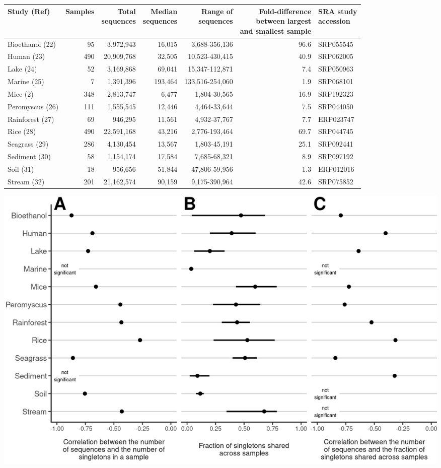 \documentclass[
]{article}
\begin{document}
\begin{longtable}[]{@{}lrrrrrl@{}}
\toprule
\textbf{Study (Ref)} & \textbf{Samples} &
\makecell[c]{\textbf{Total}\\\textbf{sequences}} &
\makecell[c]{\textbf{Median}\\\textbf{sequences}} &
\makecell[c]{\textbf{Range of}\\\textbf{sequences}} &
\makecell[c]{\textbf{Fold-difference}\\\textbf{between largest}\\\textbf{and smallest sample}}
& \makecell[c]{\textbf{SRA study}\\\textbf{accession}}\tabularnewline
\midrule
\endhead
Bioethanol (22) & 95 & 3,972,943 & 16,015 & 3,688-356,136 & 96.6 &
SRP055545\tabularnewline
Human (23) & 490 & 20,909,768 & 32,505 & 10,523-430,415 & 40.9 &
SRP062005\tabularnewline
Lake (24) & 52 & 3,169,868 & 69,041 & 15,347-112,871 & 7.4 &
SRP050963\tabularnewline
Marine (25) & 7 & 1,391,396 & 193,464 & 133,516-254,060 & 1.9 &
SRP068101\tabularnewline
Mice (2) & 348 & 2,813,747 & 6,477 & 1,804-30,565 & 16.9 &
SRP192323\tabularnewline
Peromyscus (26) & 111 & 1,555,545 & 12,446 & 4,464-33,644 & 7.5 &
SRP044050\tabularnewline
Rainforest (27) & 69 & 946,295 & 11,561 & 4,932-37,767 & 7.7 &
ERP023747\tabularnewline
Rice (28) & 490 & 22,591,168 & 43,216 & 2,776-193,464 & 69.7 &
SRP044745\tabularnewline
Seagrass (29) & 286 & 4,130,454 & 13,567 & 1,803-45,191 & 25.1 &
SRP092441\tabularnewline
Sediment (30) & 58 & 1,154,174 & 17,584 & 7,685-68,321 & 8.9 &
SRP097192\tabularnewline
Soil (31) & 18 & 956,656 & 51,844 & 47,806-59,956 & 1.3 &
ERP012016\tabularnewline
Stream (32) & 201 & 21,162,574 & 90,159 & 9,175-390,964 & 42.6 &
SRP075852\tabularnewline
\bottomrule
\end{longtable}

\normalsize

\newpage

\includegraphics{figure_1.png}
\end{document}
